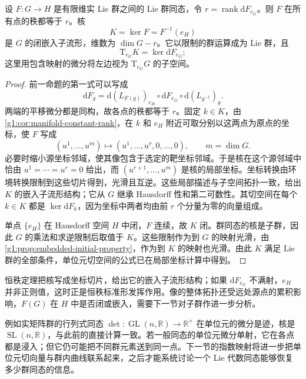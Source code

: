 \begin{proposition}\label{g1:prop:lie-homomorphism-constant-rank}
	设 \(F:G\to H\) 是有限维实 Lie 群之间的 Lie 群同态，令 \(r=\operatorname{rank}\mathrm{d}F_{e_G}\)。则 \(F\) 在所有点的秩都等于 \(r\)。核
	\[
		K=\ker F=F^{-1}(e_H)
	\]
	是 \(G\) 的闭嵌入子流形，维数为 \(\dim G-r\)。它以限制的群运算成为 Lie 群，且
	\[
		\mathrm{T}_{e_G}K=\ker\mathrm{d}F_{e_G};
	\]
	这里用包含映射的微分将左边视为 \(\mathrm{T}_{e_G}G\) 的子空间。
\end{proposition}
\begin{proof}
	前一命题的第一式可以写成
	\[
		\mathrm{d}F_g
		=\mathrm{d}(L_{F(g)})_{e_H}\circ\mathrm{d}F_{e_G}\circ\mathrm{d}(L_{g^{-1}})_g.
	\]
	两端的平移微分都是同构，故各点的秩都等于 \(r\)。固定 \(k\in K\)，由\cref{g1:cor:manifold-constant-rank}，在 \(k\) 和 \(e_H\) 附近可取分别以这两点为原点的坐标，使 \(F\) 写成
	\[
		(u^1,\ldots,u^m)\longmapsto(u^1,\ldots,u^r,0,\ldots,0),\qquad m=\dim G.
	\]
	必要时缩小源坐标邻域，使其像包含于选定的靶坐标邻域。于是核在这个源邻域中恰由 \(u^1=\cdots=u^r=0\) 给出，而 \((u^{r+1},\ldots,u^m)\) 是核的局部坐标。坐标转换由环境转换限制到这些切片得到，光滑且互逆。这些局部描述与子空间拓扑一致，给出 \(K\) 的嵌入子流形结构；它从 \(G\) 继承 Hausdorff 性和第二可数性。其切空间在每个 \(k\in K\) 都是 \(\ker\mathrm{d}F_k\)，因为坐标中两者均由前 \(r\) 个分量为零的向量组成。

	单点 \(\{e_H\}\) 在 Hausdorff 空间 \(H\) 中闭，\(F\) 连续，故 \(K\) 闭。群同态的核是子群，因此 \(G\) 的乘法和求逆限制后取值于 \(K\)。这些限制作为到 \(G\) 的映射光滑，由\cref{g1:prop:embedded-initial-property}，作为到 \(K\) 的映射也光滑。由此 \(K\) 满足 Lie 群的全部条件，单位元切空间的公式已在局部坐标计算中得到。
\end{proof}

恒秩定理把核写成坐标切片，给出它的嵌入子流形结构；如果 \(\mathrm{d}F_{e_G}\) 不满射，\(e_H\) 并非正则值，这时正是恒秩标准形发挥作用。像的整体拓扑还受远处源点的累积影响，\(F(G)\) 在 \(H\) 中是否闭或嵌入，需要下一节对子群作进一步分析。

\ProseParagraphBreak

例如实矩阵群的行列式同态 \(\det:\operatorname{GL}(n,\mathbb R)\to\mathbb R^\times\) 在单位元的微分是迹，核是 \(\operatorname{SL}(n,\mathbb R)\)，与此前的直接计算一致。若一般同态的单位元微分单射，它在各点都是浸入；但它仍可能把不同群元素送到同一点。下一节的指数映射将进一步把单位元切向量与群内曲线联系起来，之后才能系统讨论一个 Lie 代数同态能够恢复多少群同态的信息。

